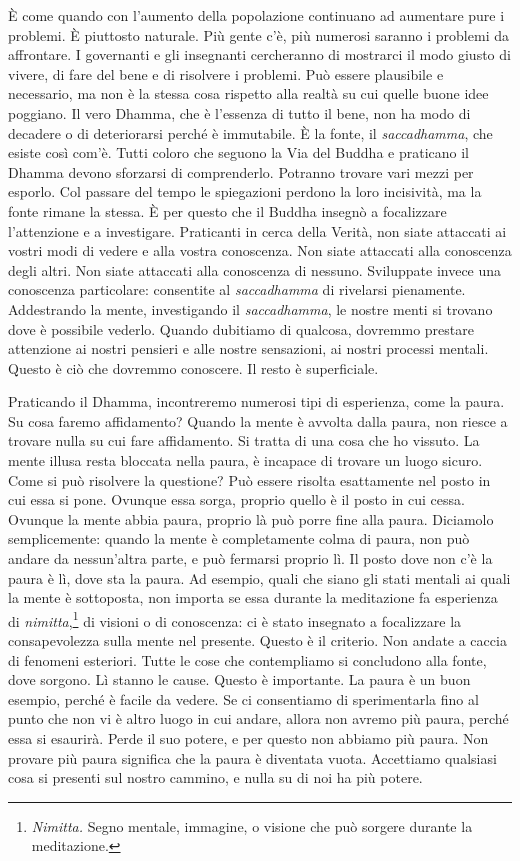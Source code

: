 È come quando con l'aumento della popolazione continuano ad aumentare
pure i problemi. È piuttosto naturale. Più gente c'è, più numerosi
saranno i problemi da affrontare. I governanti e gli insegnanti
cercheranno di mostrarci il modo giusto di vivere, di fare del bene e di
risolvere i problemi. Può essere plausibile e necessario, ma non è la
stessa cosa rispetto alla realtà su cui quelle buone idee poggiano. Il
vero Dhamma, che è l'essenza di tutto il bene, non ha modo di decadere o
di deteriorarsi perché è immutabile. È la fonte, il \emph{saccadhamma},
che esiste così com'è. Tutti coloro che seguono la Via del Buddha e
praticano il Dhamma devono sforzarsi di comprenderlo. Potranno trovare
vari mezzi per esporlo. Col passare del tempo le spiegazioni perdono la
loro incisività, ma la fonte rimane la stessa. È per questo che il
Buddha insegnò a focalizzare l'attenzione e a investigare. Praticanti in
cerca della Verità, non siate attaccati ai vostri modi di vedere e alla
vostra conoscenza. Non siate attaccati alla conoscenza degli altri. Non
siate attaccati alla conoscenza di nessuno. Sviluppate invece una
conoscenza particolare: consentite al \emph{saccadhamma} di rivelarsi
pienamente. Addestrando la mente, investigando il \emph{saccadhamma}, le
nostre menti si trovano dove è possibile vederlo. Quando dubitiamo di
qualcosa, dovremmo prestare attenzione ai nostri pensieri e alle nostre
sensazioni, ai nostri processi mentali. Questo è ciò che dovremmo
conoscere. Il resto è superficiale.

Praticando il Dhamma, incontreremo numerosi tipi di esperienza, come la
paura. Su cosa faremo affidamento? Quando la mente è avvolta dalla
paura, non riesce a trovare nulla su cui fare affidamento. Si tratta di
una cosa che ho vissuto. La mente illusa resta bloccata nella paura, è
incapace di trovare un luogo sicuro. Come si può risolvere la questione?
Può essere risolta esattamente nel posto in cui essa si pone. Ovunque
essa sorga, proprio quello è il posto in cui cessa. Ovunque la mente
abbia paura, proprio là può porre fine alla paura. Diciamolo
semplicemente: quando la mente è completamente colma di paura, non può
andare da nessun'altra parte, e può fermarsi proprio lì. Il posto dove
non c'è la paura è lì, dove sta la paura. Ad esempio, quali che siano
gli stati mentali ai quali la mente è sottoposta, non importa se essa
durante la meditazione fa esperienza di \emph{nimitta},\footnote{\emph{Nimitta.}
  Segno mentale, immagine, o visione che può sorgere durante la
  meditazione.} di visioni o di conoscenza: ci è stato insegnato a
focalizzare la consapevolezza sulla mente nel presente. Questo è il
criterio. Non andate a caccia di fenomeni esteriori. Tutte le cose che
contempliamo si concludono alla fonte, dove sorgono. Lì stanno le cause.
Questo è importante. La paura è un buon esempio, perché è facile da
vedere. Se ci consentiamo di sperimentarla fino al punto che non vi è
altro luogo in cui andare, allora non avremo più paura, perché essa si
esaurirà. Perde il suo potere, e per questo non abbiamo più paura. Non
provare più paura significa che la paura è diventata vuota. Accettiamo
qualsiasi cosa si presenti sul nostro cammino, e nulla su di noi ha più
potere.

